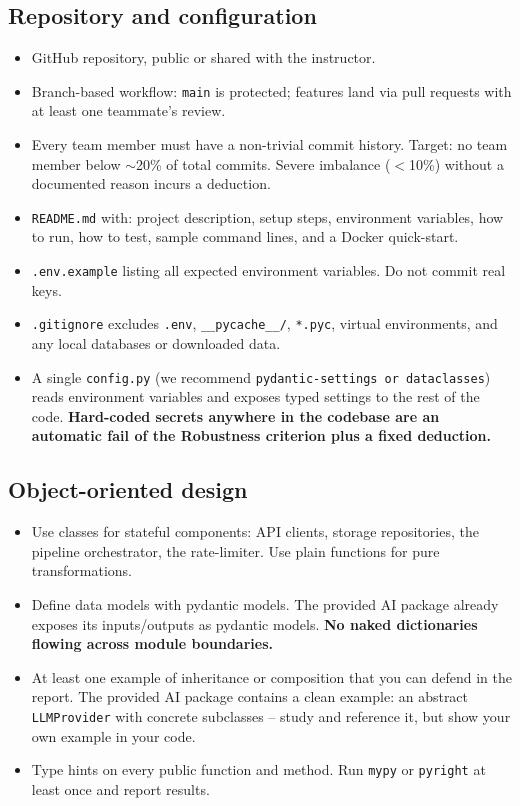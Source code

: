 \documentclass[11pt,a4paper]{article}
\newcommand{\warn}[1]{\textcolor{accent2}{\textbf{#1}}}
\begin{document}
\subsection{Repository and configuration}
\begin{itemize}[topsep=2pt,itemsep=1pt]
  \item GitHub repository, public or shared with the instructor.
  \item Branch-based workflow: \texttt{main} is protected; features land via pull requests with at least one teammate's review.
  \item Every team member must have a non-trivial commit history. Target: no team member below $\sim$20\% of total commits. Severe imbalance ($<$10\%) without a documented reason incurs a deduction.
  \item \texttt{README.md} with: project description, setup steps, environment variables, how to run, how to test, sample command lines, and a Docker quick-start.
  \item \texttt{.env.example} listing all expected environment variables. Do not commit real keys.
  \item \texttt{.gitignore} excludes \texttt{.env}, \texttt{\_\_pycache\_\_/}, \texttt{*.pyc}, virtual environments, and any local databases or downloaded data.
  \item A single \texttt{config.py} (we recommend \texttt{pydantic-settings or dataclasses}) reads environment variables and exposes typed settings to the rest of the code. \warn{Hard-coded secrets anywhere in the codebase are an automatic fail of the Robustness criterion plus a fixed deduction.}
\end{itemize}

\subsection{Object-oriented design}
\begin{itemize}[topsep=2pt,itemsep=1pt]
  \item Use classes for stateful components: API clients, storage repositories, the pipeline orchestrator, the rate-limiter. Use plain functions for pure transformations.
  \item Define data models with pydantic models. The provided AI package already exposes its inputs/outputs as pydantic models. \warn{No naked dictionaries flowing across module boundaries.}
  \item At least one example of inheritance or composition that you can defend in the report. The provided AI package contains a clean example: an abstract \texttt{LLMProvider} with concrete subclasses -- study and reference it, but show your own example in your code.
  \item Type hints on every public function and method. Run \texttt{mypy} or \texttt{pyright} at least once and report results.
\end{itemize}
\end{document}

